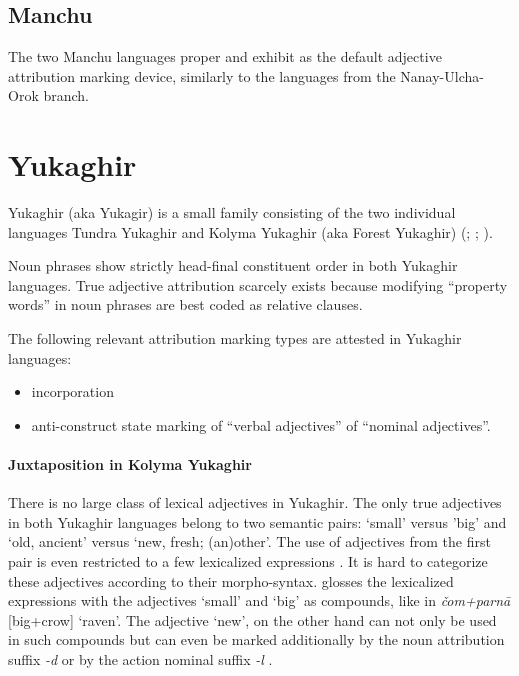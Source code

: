 \subsection{Manchu}
The two Manchu languages  proper and  exhibit  as the default adjective attribution marking device, similarly to the languages from the Nanay-Ulcha-Orok branch.

\section{Yukaghir}
\label{yukagir synchr}
Yukaghir (aka Yukagir) is a small family consisting of the two individual languages Tundra Yukaghir and Kolyma Yukaghir (aka Forest Yukaghir) (\citealt[223]{salminen2007}; \citealt[1–2]{maslova2003a}; \citealt[1]{maslova2003b}).

Noun phrases show strictly head-final constituent order in both Yukaghir languages. True adjective attribution scarcely exists because modifying “property words” in noun phrases are best coded as relative clauses.

The following relevant attribution marking types are attested in Yukaghir languages:
\begin{itemize}
\item incorporation
\item anti\hyp{}construct state marking
	\subitem of “verbal adjectives”
	\subitem of “nominal adjectives”.
\end{itemize}

\paragraph*{Juxtaposition in Kolyma Yukaghir}
There is no large class of lexical adjectives in Yukaghir. The only true adjectives in both Yukaghir languages belong to two semantic pairs: ‘small’ versus ’big’ and ‘old, ancient’ versus ‘new, fresh; (an)other’. The use of adjectives from the first pair is even restricted to a few lexicalized expressions \citep[70–71]{maslova2003b}. It is hard to categorize these adjectives according to their morpho-syntax. \citet[71]{maslova2003b} glosses the lexicalized expressions with the adjectives ‘small’ and ‘big’ as compounds, like in \textit{čom+parnā} [big+crow] ‘raven’. The adjective ‘new’, on the other hand can not only be used in such compounds but can even be marked additionally by the noun attribution suffix \textit{-d} or by the action nominal suffix \textit{-l} \citep[71]{maslova2003b}.

